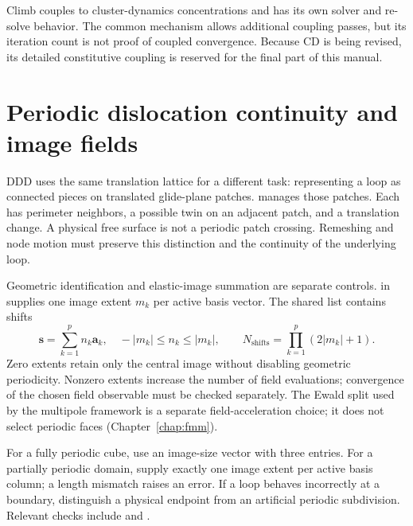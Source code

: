 Climb couples to cluster-dynamics concentrations and has its own solver and re-solve behavior. The common  mechanism allows additional coupling passes, but its iteration count is not proof of coupled convergence. Because CD is being revised, its detailed constitutive coupling is reserved for the final part of this manual.

\section{Periodic dislocation continuity and image fields}\label{sec:dddPeriodicity}
DDD uses the same translation lattice for a different task: representing a loop as connected pieces on translated glide-plane patches.  manages those patches. Each  has perimeter neighbors, a possible twin on an adjacent patch, and a translation change. A physical free surface is not a periodic patch crossing. Remeshing and node motion must preserve this distinction and the continuity of the underlying loop.

Geometric identification and elastic-image summation are separate controls.  in  supplies one image extent $m_k$ per active basis vector. The shared list contains shifts
\begin{equation}
\bm s=\sum_{k=1}^{p}n_k\bm a_k,\quad -|m_k|\le n_k\le|m_k|,
\qquad N_{\mathrm{shifts}}=\prod_{k=1}^{p}(2|m_k|+1).
\end{equation}
Zero extents retain only the central image without disabling geometric periodicity. Nonzero extents increase the number of field evaluations; convergence of the chosen field observable must be checked separately. The Ewald split used by the multipole framework is a separate field-acceleration choice; it does not select periodic faces (Chapter~\ref{chap:fmm}).

For a fully periodic cube, use an image-size vector with three entries. For a partially periodic domain, supply exactly one image extent per active basis column; a length mismatch raises an error. If a loop behaves incorrectly at a boundary, distinguish a physical endpoint from an artificial periodic subdivision. Relevant checks include  and .

